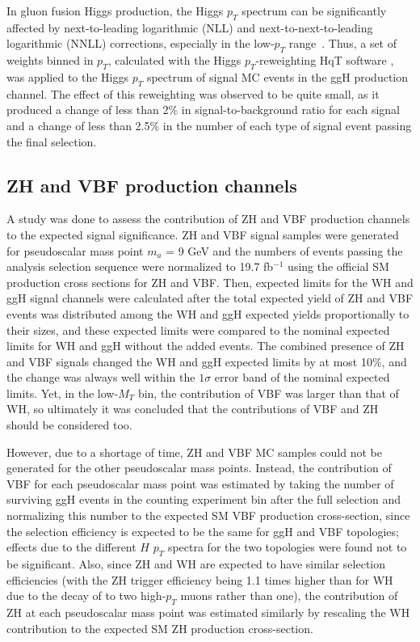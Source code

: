 In gluon fusion Higgs production, the Higgs $p_T$ spectrum can be significantly affected by next-to-leading logarithmic (NLL) and next-to-next-to-leading logarithmic (NNLL) corrections, especially in the low-$p_T$ range~\cite{Bozzi:2003jy}. Thus, a set of weights binned in $p_T$, calculated with the Higgs $p_T$-reweighting HqT software \cite{HQTDocumentation}, was applied to the Higgs $p_T$ spectrum of signal MC events in the ggH production channel. The effect of this reweighting was observed to be quite small, as it produced a change of less than 2\% in signal-to-background ratio for each signal and a change of less than 2.5\% in the number of each type of signal event passing the final selection.

\subsection{ZH and VBF production channels\label{sec:datasets-zhvbf}}

A study was done to assess the contribution of ZH and VBF production channels to the expected signal significance. ZH and VBF signal samples were generated for pseudoscalar mass point $m_{a}$ = 9 GeV and the numbers of events passing the analysis selection sequence were normalized to 19.7 fb$^{-1}$ using the official SM production cross sections for ZH and VBF. Then, expected limits for the WH and ggH signal channels were calculated after the total expected yield of ZH and VBF events was distributed among the WH and ggH expected yields proportionally to their sizes, and these expected limits were compared to the nominal expected limits for WH and ggH without the added events. The combined presence of ZH and VBF signals changed the WH and ggH expected limits by at most 10\%, and the change was always well within the $1\sigma$ error band of the nominal expected limits. Yet, in the low-$M_{T}$ bin, the contribution of VBF was larger than that of WH, so ultimately it was concluded that the contributions of VBF and ZH should be considered too.

However, due to a shortage of time, ZH and VBF MC samples could not be generated for the other pseudoscalar mass points. Instead, the contribution of VBF for each pseudoscalar mass point was estimated by taking the number of surviving ggH events in the counting experiment bin after the full selection and normalizing this number to the expected SM VBF production cross-section, since the selection efficiency is expected to be the same for ggH and VBF topologies; effects due to the different $H$ $p_T$ spectra for the two topologies were found not to be significant. Also, since ZH and WH are expected to have similar selection efficiencies (with the ZH trigger efficiency being 1.1 times higher than for WH due to the decay of \Z to two high-$p_T$ muons rather than one), the contribution of ZH at each pseudoscalar mass point was estimated similarly by rescaling the WH contribution to the expected SM ZH production cross-section.

